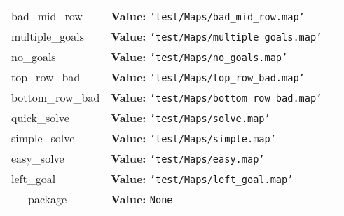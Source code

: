 \begin{longtable}{|p{\varnamewidth}|p{\vardescrwidth}|l}
\cline{1-2}
\raggedright b\-a\-d\-\_\-m\-i\-d\-\_\-r\-o\-w\- & \raggedright \textbf{Value:} 
{\tt \texttt{'}\texttt{test/Maps/bad\_mid\_row.map}\texttt{'}}&\\
\cline{1-2}
\raggedright m\-u\-l\-t\-i\-p\-l\-e\-\_\-g\-o\-a\-l\-s\- & \raggedright \textbf{Value:} 
{\tt \texttt{'}\texttt{test/Maps/multiple\_goals.map}\texttt{'}}&\\
\cline{1-2}
\raggedright n\-o\-\_\-g\-o\-a\-l\-s\- & \raggedright \textbf{Value:} 
{\tt \texttt{'}\texttt{test/Maps/no\_goals.map}\texttt{'}}&\\
\cline{1-2}
\raggedright t\-o\-p\-\_\-r\-o\-w\-\_\-b\-a\-d\- & \raggedright \textbf{Value:} 
{\tt \texttt{'}\texttt{test/Maps/top\_row\_bad.map}\texttt{'}}&\\
\cline{1-2}
\raggedright b\-o\-t\-t\-o\-m\-\_\-r\-o\-w\-\_\-b\-a\-d\- & \raggedright \textbf{Value:} 
{\tt \texttt{'}\texttt{test/Maps/bottom\_row\_bad.map}\texttt{'}}&\\
\cline{1-2}
\raggedright q\-u\-i\-c\-k\-\_\-s\-o\-l\-v\-e\- & \raggedright \textbf{Value:} 
{\tt \texttt{'}\texttt{test/Maps/solve.map}\texttt{'}}&\\
\cline{1-2}
\raggedright s\-i\-m\-p\-l\-e\-\_\-s\-o\-l\-v\-e\- & \raggedright \textbf{Value:} 
{\tt \texttt{'}\texttt{test/Maps/simple.map}\texttt{'}}&\\
\cline{1-2}
\raggedright e\-a\-s\-y\-\_\-s\-o\-l\-v\-e\- & \raggedright \textbf{Value:} 
{\tt \texttt{'}\texttt{test/Maps/easy.map}\texttt{'}}&\\
\cline{1-2}
\raggedright l\-e\-f\-t\-\_\-g\-o\-a\-l\- & \raggedright \textbf{Value:} 
{\tt \texttt{'}\texttt{test/Maps/left\_goal.map}\texttt{'}}&\\
\cline{1-2}
\raggedright \_\-\_\-p\-a\-c\-k\-a\-g\-e\-\_\-\_\- & \raggedright \textbf{Value:} 
{\tt None}&\\
\cline{1-2}
\end{longtable}

